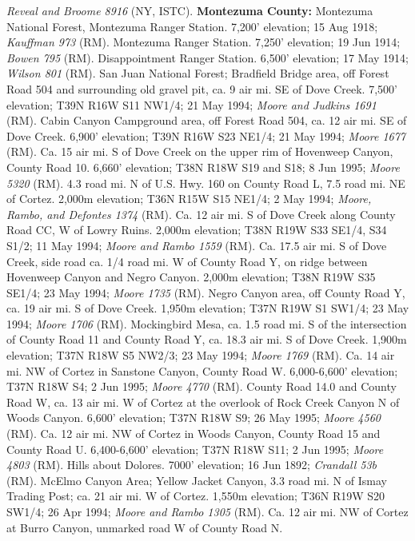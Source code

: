 \textit{Reveal and Broome 8916} (NY, ISTC).
  \textbf{Montezuma County:}
Montezuma National Forest, Montezuma Ranger Station. 7,200' elevation;
15 Aug 1918; \textit{Kauffman 973} (RM).
Montezuma Ranger Station. 7,250' elevation; 19 Jun 1914; \textit{Bowen 795} (RM).
Disappointment Ranger Station. 6,500' elevation; 17 May 1914;
\textit{Wilson 801} (RM).
San Juan National Forest; Bradfield Bridge area, off Forest Road 504 and
surrounding old gravel pit, ca. 9 air mi. SE of Dove Creek. 7,500' elevation;
T39N R16W S11 NW1/4; 21 May 1994; \textit{Moore and Judkins 1691} (RM).
Cabin Canyon Campground area, off Forest Road 504, ca. 12 air mi. SE of
Dove Creek. 6,900' elevation; T39N R16W S23 NE1/4; 21 May 1994;
\textit{Moore 1677} (RM).
Ca. 15 air mi. S of Dove Creek on the upper rim of Hovenweep Canyon,
County Road 10. 6,660' elevation; T38N R18W S19 and S18; 8 Jun 1995;
\textit{Moore 5320} (RM).
4.3 road mi. N of U.S. Hwy. 160 on County Road L, 7.5 road mi. NE of Cortez.
2,000m elevation; T36N R15W S15 NE1/4; 2 May 1994;
\textit{Moore, Rambo, and Defontes 1374} (RM).
Ca. 12 air mi. S of Dove Creek along County Road CC, W of Lowry Ruins.
2,000m elevation; T38N R19W S33 SE1/4, S34 S1/2; 11 May 1994;
\textit{Moore and Rambo 1559} (RM).
Ca. 17.5 air mi. S of Dove Creek, side road ca. 1/4 road mi. W of County Road Y,
on ridge between Hovenweep Canyon and Negro Canyon. 2,000m elevation;
T38N R19W S35 SE1/4; 23 May 1994; \textit{Moore 1735} (RM).
Negro Canyon area, off County Road Y, ca. 19 air mi. S of Dove Creek.
1,950m elevation; T37N R19W S1 SW1/4; 23 May 1994; \textit{Moore 1706} (RM).
Mockingbird Mesa, ca. 1.5 road mi. S of the intersection of County Road 11 and
County Road Y, ca. 18.3 air mi. S of Dove Creek. 1,900m elevation;
T37N R18W S5 NW2/3; 23 May 1994; \textit{Moore 1769} (RM).
Ca. 14 air mi. NW of Cortez in Sanstone Canyon, County Road W. 6,000-6,600'
elevation; T37N R18W S4; 2 Jun 1995; \textit{Moore 4770} (RM).
County Road 14.0 and County Road W, ca. 13 air mi. W of Cortez at the overlook
of Rock Creek Canyon N of Woods Canyon. 6,600' elevation; T37N R18W S9;
26 May 1995; \textit{Moore 4560} (RM).
Ca. 12 air mi. NW of Cortez in Woods Canyon, County Road 15 and County Road U.
6,400-6,600' elevation; T37N R18W S11; 2 Jun 1995; \textit{Moore 4803} (RM).
Hills about Dolores. 7000' elevation; 16 Jun 1892; \textit{Crandall 53b} (RM).
McElmo Canyon Area; Yellow Jacket Canyon, 3.3 road mi. N of Ismay Trading Post;
ca. 21 air mi. W of Cortez. 1,550m elevation; T36N R19W S20 SW1/4; 26 Apr 1994;
\textit{Moore and Rambo 1305} (RM).
Ca. 12 air mi. NW of Cortez at Burro Canyon, unmarked road W of County Road N.
